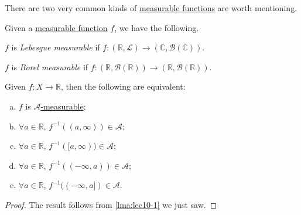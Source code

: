 There are two very common kinds of \hyperref[def:measurable-function]{measurable functions} are worth mentioning.
\begin{definition*}
	Given a \hyperref[def:measurable-function]{measurable function} \(f\), we have the following.
	\begin{definition}\label{def:Lebesgue-measurable}
		\(f\) is \emph{Lebesgue measurable} if \(f\colon (\mathbb{R} , \mathcal{L} ) \to (\mathbb{C} , \mathcal{B} (\mathbb{C}))\).
	\end{definition}

	\begin{definition}\label{def:Borel-measurable}
		\(f\) is \emph{Borel measurable} if \(f\colon (\mathbb{R} , \mathcal{B} (\mathbb{R} ))\to (\mathbb{R} , \mathcal{B} (\mathbb{R} ))\).
	\end{definition}
\end{definition*}


\begin{lemma}\label{lma:lec10-2}
	Given \(f\colon X\to \mathbb{R} \), then the following are equivalent:
	\begin{enumerate}[(a)]
		\item \(f\) is \hyperref[def:A-measurable-function]{\(\mathcal{A}\)-measurable};
		\item \(\forall a\in\mathbb{R} \), \(f^{-1} ((a, \infty ))\in\mathcal{A} \);
		\item \(\forall a\in\mathbb{R} \), \(f^{-1} ([a, \infty ))\in\mathcal{A} \);
		\item \(\forall a\in\mathbb{R} \), \(f^{-1} ((-\infty, a))\in\mathcal{A} \);
		\item \(\forall a\in\mathbb{R} \), \(f^{-1} ((-\infty, a])\in\mathcal{A} \).
	\end{enumerate}
\end{lemma}
\begin{proof}
	The result follows from \autoref{lma:lec10-1} we just saw.
\end{proof}

